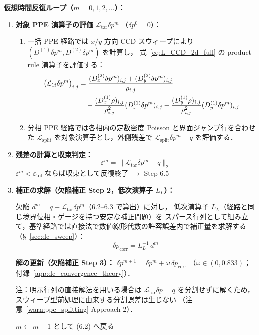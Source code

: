 \textbf{仮想時間反復ループ（$m = 0, 1, 2, \dots$）：}
\begin{enumerate}
  \item[(6.2)] \textbf{対象 PPE 演算子の評価} $\mathcal{L}_{\mathrm{tar}}\delta p^m$
  （$\delta p^0 = 0$）：
  \begin{enumerate}
    \item 一括 PPE 経路では $x/y$ 方向 CCD スウィープにより
    $(D^{(1)}\delta p^m,D^{(2)}\delta p^m)$ を計算し，
    式~\eqref{eq:L_CCD_2d_full} の product-rule 演算子を評価する：
    \begin{align}
      \bigl(\mathcal{L}_{\mathrm{1f}}\delta p^m\bigr)_{i,j}
      &= \frac{(D_x^{(2)}\delta p^m)_{i,j} + (D_y^{(2)}\delta p^m)_{i,j}}{\rho_{i,j}}
      \notag\\
      &\quad
      - \frac{(D_x^{(1)}\rho)_{i,j}}{\rho_{i,j}^2}(D_x^{(1)}\delta p^m)_{i,j}
      - \frac{(D_y^{(1)}\rho)_{i,j}}{\rho_{i,j}^2}(D_y^{(1)}\delta p^m)_{i,j}
      \label{eq:L_1f_dc_ppe_app}
    \end{align}
    \item 分相 PPE 経路では各相内の定数密度 Poisson と界面ジャンプ行を合わせた
    $\mathcal{L}_{\mathrm{split}}$ を対象演算子とし，外側残差で
    $\mathcal{L}_{\mathrm{split}}\delta p^m-q$ を評価する．
  \end{enumerate}

  \item[(6.3)] \textbf{残差の計算と収束判定：}
  \[
    \varepsilon^m = \bigl\|\mathcal{L}_{\mathrm{tar}}\delta p^m - q\bigr\|_2
  \]
  $\varepsilon^m < \varepsilon_{\mathrm{tol}}$ ならば収束として反復終了 $\rightarrow$ Step 6.5

  \item[(6.4)] \textbf{補正の求解（欠陥補正 Step 2，低次演算子 $L_L$）：}

  欠陥 $d^m = q - \mathcal{L}_{\mathrm{tar}}\delta p^m$（6.2--6.3 で算出）に対し，
  低次演算子 $L_L$（経路と同じ境界位相・ゲージを持つ安定な補正問題）を
  スパース行列として組み立て，基準経路では直接法で数値線形代数の許容誤差内で補正量を求解する
  （§~\ref{sec:dc_sweep}）：
  \[
    \delta p_{\mathrm{corr}} = L_L^{-1}\,d^m
  \]

  \textbf{解の更新（欠陥補正 Step 3）：}
  $\delta p^{m+1} = \delta p^m + \omega\,\delta p_{\mathrm{corr}}$
  （$\omega \in (0, 0.833)$；付録~\ref{app:dc_convergence_theory}）．

  \medskip
  \noindent 注：明示行列の直接解法を用いる場合は
  $\mathcal{L}_{\mathrm{tar}}\delta p = q$ を分割せずに解くため，
  スウィープ型前処理に由来する分割誤差は生じない
  （注意~\ref{warn:ppe_splitting} Approach 2）．

  $m \leftarrow m+1$ として (6.2) へ戻る
\end{enumerate}

